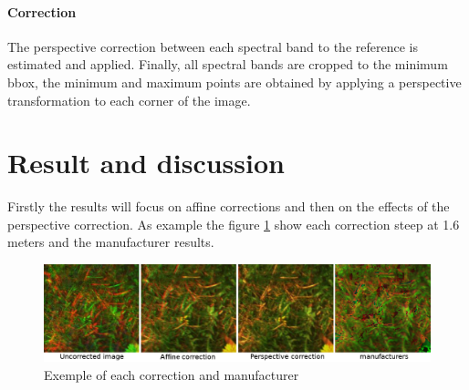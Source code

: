 \documentclass[]{elsarticle}
\begin{document}
	\paragraph{Correction}
	
	The perspective correction between each spectral band to the reference is estimated and applied.
	Finally, all spectral bands are cropped to the minimum bbox,
	the minimum and maximum points are obtained by applying a perspective transformation to each corner of the image.
	
	
	\section{Result and discussion}
	
	Firstly the results will focus on affine corrections and then on the effects of the perspective correction.
	As example the figure \ref{fig:merged-correction} show each correction steep at 1.6 meters and the manufacturer results.
	
	\begin{figure}[!htb]
		\centering
		\includegraphics[width=\linewidth]{../figures/merged-correction.png}
		\caption{Exemple of each correction and manufacturer}
		\label{fig:merged-correction}
	\end{figure}
	
\end{document}
